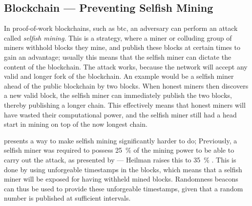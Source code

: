 \subsection{Blockchain --- Preventing Selfish Mining}\label{sub:blockchain_preventing_selfish_mining}
In proof-of-work blockchains, such as \gls{btc}, an adversary can perform an attack called \emph{selfish mining}.
This is a strategy, where a miner or colluding group of miners withhold blocks they mine, and publish these blocks at certain times to gain an advantage;
usually this means that the selfish miner can dictate the content of the blockchain.
The attack works, because the network will accept any valid and longer fork of the blockchain.
An example would be a selfish miner ahead of the public blockchain by two blocks.
When honest miners then discovers a new valid block, the selfish miner can immediately publish the two blocks, thereby publishing a longer chain.
This effectively means that honest miners will have wasted their computational power, and the selfish miner still had a head start in mining on top of the now longest chain.

\citet{heilman2014one} presents a way to make selfish mining significantly harder to do;
Previously, a selfish miner was required to possess 25~\%  of the mining power to be able to carry out the attack, as presented by \citet{eyal2014majority} --- Heilman raises this to 35~\% .
This is done by using unforgeable timestamps in the blocks, which means that a selfish miner will be exposed for having withheld mined blocks.
Randomness beacons can thus be used to provide these unforgeable timestamps, given that a random number is published at sufficient intervals.
